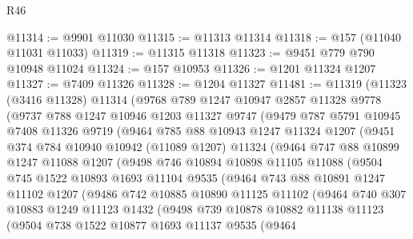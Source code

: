 \begin{lexlean}{R46}
\begin{coremodule}
@11314 := @9901 @11030
@11315 := @11313 @11314
@11318 := @157 (@11040 @11031 @11033)
@11319 := @11315 @11318
@11323 := @9451 @779 @790 @10948 @11024
@11324 := @157 @10953
@11326 := @1201 @11324 @1207
@11327 := @7409 @11326
@11328 := @1204 @11327
@11481 := @11319
    (@11323
      (@3416 @11328)
      @11314
      (@9768
        @789
        @1247
        @10947
        @2857
        @11328
        @9778
        (@9737
          @788
          @1247
          @10946
          @1203
          @11327
          @9747
          (@9479
            @787
            @5791
            @10945
            @7408
            @11326
            @9719
            (@9464
              @785
              @88
              @10943
              @1247
              @11324
              @1207
              (@9451
                @374
                @784
                @10940
                @10942
                (@11089 @1207)
                @11324
                (@9464
                  @747
                  @88
                  @10899
                  @1247
                  @11088
                  @1207
                  (@9498
                    @746
                    @10894
                    @10898
                    @11105
                    @11088
                    (@9504
                      @745
                      @1522
                      @10893
                      @1693
                      @11104
                      @9535
                      (@9464
                        @743
                        @88
                        @10891
                        @1247
                        @11102
                        @1207
                        (@9486
                          @742
                          @10885
                          @10890
                          @11125
                          @11102
                          (@9464
                            @740
                            @307
                            @10883
                            @1249
                            @11123
                            @1432
                            (@9498
                              @739
                              @10878
                              @10882
                              @11138
                              @11123
                              (@9504
                                @738
                                @1522
                                @10877
                                @1693
                                @11137
                                @9535
                                (@9464

\end{coremodule}
\end{lexlean}
